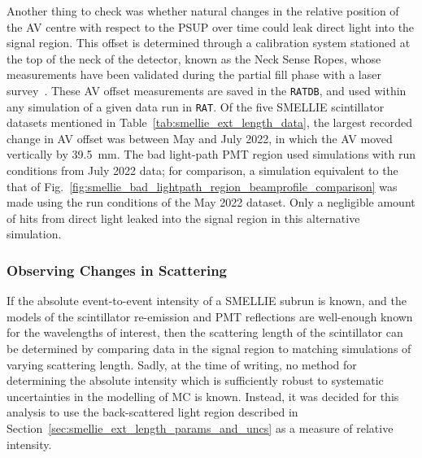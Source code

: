 Another thing to check was whether natural changes in the relative position of the AV centre with respect to the PSUP over time could leak direct light into the signal region. This offset is determined through a calibration system stationed at the top of the neck of the detector, known as the Neck Sense Ropes, whose measurements have been validated during the partial fill phase with a laser survey~\cite{khaghaniNeckSenseRope2015,khaghani16NCalibrationBackground2022}. These AV offset measurements are saved in the \texttt{RATDB}, and used within any simulation of a given data run in \texttt{RAT}. Of the five SMELLIE scintillator datasets mentioned in Table~\ref{tab:smellie_ext_length_data}, the largest recorded change in AV offset was between May and July 2022, in which the AV moved vertically by \SI{39.5}{\mm}. The bad light-path PMT region used simulations with run conditions from July 2022 data; for comparison, a simulation equivalent to the that of Fig.~\ref{fig:smellie_bad_lightpath_region_beamprofile_comparison} was made using the run conditions of the May 2022 dataset. Only a negligible amount of hits from direct light leaked into the signal region in this alternative simulation.

\subsubsection{Observing Changes in Scattering}
If the absolute event-to-event intensity of a SMELLIE subrun is known, and the models of the scintillator re-emission and PMT reflections are well-enough known for the wavelengths of interest, then the scattering length of the scintillator can be determined by comparing data in the signal region to matching simulations of varying scattering length. Sadly, at the time of writing, no method for determining the absolute intensity which is sufficiently robust to systematic uncertainties in the modelling of MC is known. Instead, it was decided for this analysis to use the back-scattered light region described in Section~\ref{sec:smellie_ext_length_params_and_uncs} as a measure of relative intensity.

